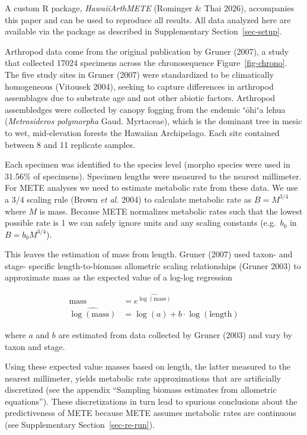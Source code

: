 \documentclass[
  letterpaper,
  DIV=11,
  numbers=noendperiod]{scrartcl}
\newcommand{\ssec}[1]{Supplementary Section~\ref{#1}}
\begin{document}
A custom R package, \emph{HawaiiArthMETE} (Rominger \& Thai 2026),
accompanies this paper and can be used to reproduce all results. All
data analyzed here are available via the package as described in
\ssec{sec-setup}.

Arthropod data come from the original publication by Gruner (2007), a
study that collected 17024 specimens across the chronosequence
Figure~\ref{fig-chrono}. The five study sites in Gruner (2007) were
standardized to be climatically homogeneous (Vitousek 2004), seeking to
capture differences in arthropod assemblages due to substrate age and
not other abiotic factors. Arthropod assembledges were collected by
canopy fogging from the endemic ʻōhiʻa lehua (\emph{Metrosideros
polymorpha} Gaud. Myrtaceae), which is the dominant tree in mesic to
wet, mid-elevation forests the Hawaiian Archipelago. Each site contained
between 8 and 11 replicate samples.

Each specimen was identified to the species level (morpho species were
used in 31.56\% of specimens). Specimen lengths were measured to the
nearest millimeter. For METE analyses we need to estimate metabolic rate
from these data. We use a \(3/4\) scaling rule (Brown \emph{et al.}
2004) to calculate metabolic rate as \(B = M^{3/4}\) where \(M\) is
mass. Because METE normalizes metabolic rates such that the lowest
possible rate is 1 we can safely ignore units and any scaling constants
(e.g.~\(b_0\) in \(B = b_0 M^{3/4}\)).

This leaves the estimation of mass from length. Gruner (2007) used
taxon- and stage- specific length-to-biomass allometric scaling
relationships (Gruner 2003) to approximate mass as the expected value of
a log-log regression

\[
\begin{aligned}
\text{mass} & = e^{\widehat{\log(\text{mass})}} \\
\widehat{\log(\text{mass})} &= \log(a) + b \cdot \log(\text{length})
\end{aligned}
\]

where \(a\) and \(b\) are estimated from data collected by Gruner (2003)
and vary by taxon and stage.

Using these expected value masses based on length, the latter measured
to the nearest millimeter, yields metabolic rate approximations that are
artificially discretized (see the appendix ``Sampling biomass estimates
from allometric equations''). These discretizations in turn lead to
spurious conclusions about the predictiveness of METE because METE
assumes metabolic rates are continuous (see \ssec{sec-re-run}).
\end{document}
